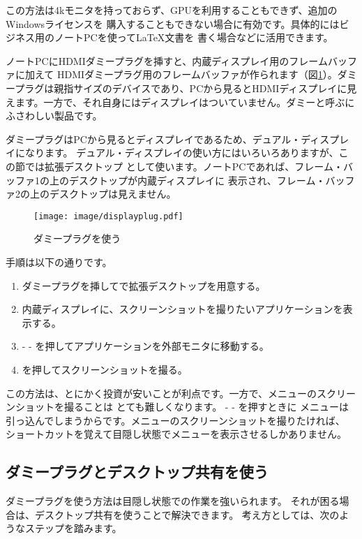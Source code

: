 この方法は4kモニタを持っておらず、GPUを利用することもできず、追加のWindowsライセンスを
購入することもできない場合に有効です。具体的にはビジネス用のノートPCを使って\LaTeX 文書を
書く場合などに活用できます。

ノートPCにHDMIダミープラグを挿すと、内蔵ディスプレイ用のフレームバッファに加えて
HDMIダミープラグ用のフレームバッファが作られます（図\ref{fig:display-plug}）。ダミープラグは親指サイズのデバイスであり、PCから見るとHDMIディスプレイに見えます。一方で、それ自身にはディスプレイはついていません。ダミーと呼ぶにふさわしい製品です。

ダミープラグはPCから見るとディスプレイであるため、デュアル・ディスプレイになります。
デュアル・ディスプレイの使い方にはいろいろありますが、この節では拡張デスクトップ
として使います。ノートPCであれば、フレーム・バッファ1の上のデスクトップが内蔵ディスプレイに
表示され、フレーム・バッファ2の上のデスクトップは見えません。


\begin{figure}[btp]
  \begin{center}
    \texttt{[image: image/displayplug.pdf]}
    \caption{ダミープラグを使う} \label{fig:display-plug}
  \end{center}
\end{figure}



手順は以下の通りです。

\begin{enumerate}
  \item ダミープラグを挿してで拡張デスクトップを用意する。
  \item 内蔵ディスプレイに、スクリーンショットを撮りたいアプリケーションを表示する。
  \item {} -  - を押してアプリケーションを外部モニタに移動する。
  \item {}を押してスクリーンショットを撮る。
\end{enumerate}

この方法は、とにかく投資が安いことが利点です。一方で、メニューのスクリーンショットを撮ることは
とても難しくなります。 -  - を押すときに
メニューは引っ込んでしまうからです。メニューのスクリーンショットを撮りたければ、
ショートカットを覚えて目隠し状態でメニューを表示させるしかありません。



\subsection{ダミープラグとデスクトップ共有を使う}
ダミープラグを使う方法は目隠し状態での作業を強いられます。
それが困る場合は、デスクトップ共有を使うことで解決できます。
考え方としては、次のようなステップを踏みます。

